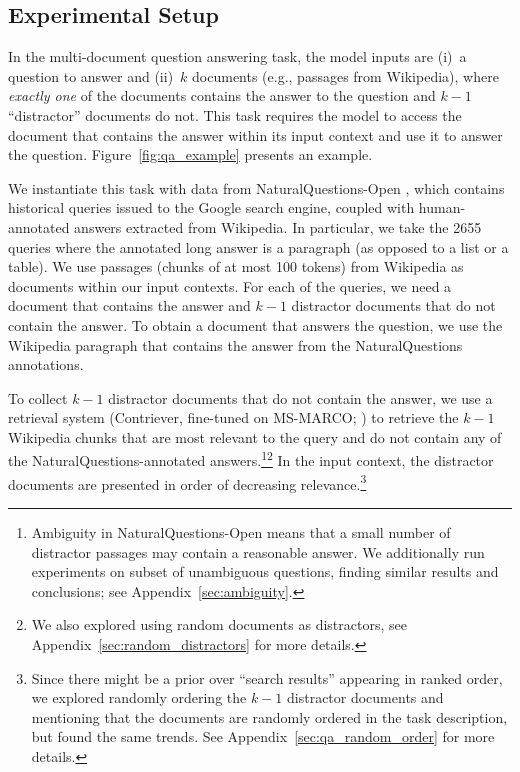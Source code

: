 \subsection{Experimental Setup}

In the multi-document question answering task, the model inputs are (i)~a question to answer and (ii)~$k$ documents (e.g., passages from Wikipedia), where \emph{exactly one} of the documents contains the answer to the question and $k - 1$ ``distractor'' documents do not. This task requires the model to access the document that contains the answer within its input context and use it to answer the question.
Figure~\ref{fig:qa_example} presents an example.

We instantiate this task with data from NaturalQuestions-Open \citep{lee-etal-2019-latent,kwiatkowski-etal-2019-natural}, which contains historical queries issued to the Google search engine, coupled with human-annotated answers extracted from Wikipedia. In particular, we take the 2655 queries where the annotated long answer is a paragraph (as opposed to a list or a table). We use passages (chunks of at most 100 tokens) from Wikipedia as documents within our input contexts. For each of the queries, we need a document that contains the answer and $k-1$ distractor documents that do not contain the answer. To obtain a document that answers the question, we use the Wikipedia paragraph that contains the answer from the NaturalQuestions annotations.

To collect $k-1$ distractor documents that do not contain the answer, we use a retrieval system (Contriever, fine-tuned on MS-MARCO; \citealp{izacard2021contriever}) to retrieve the $k-1$ Wikipedia chunks that are most relevant to the query and do not contain any of the NaturalQuestions-annotated answers.\footnote{Ambiguity in NaturalQuestions-Open means that a small number of distractor passages may contain a reasonable answer. We additionally run experiments on subset of unambiguous questions, finding similar results and conclusions; see Appendix~\ref{sec:ambiguity}.}\footnote{We also explored using random documents as distractors, see Appendix~\ref{sec:random_distractors} for more details.} In the input context, the distractor documents are presented in order of decreasing relevance.\footnote{Since there might be a prior over ``search results'' appearing in ranked order, we explored randomly ordering the $k-1$ distractor documents and mentioning that the documents are randomly ordered in the task description, but found the same trends. See Appendix~\ref{sec:qa_random_order} for more details.}

